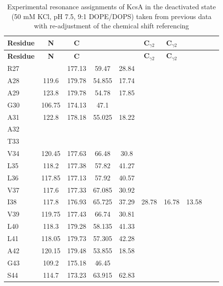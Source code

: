 \documentclass[%
 aip,
 amsmath,amssymb,
 preprint,%
]{revtex4-1}
\newcommand{\ca}{\ce{C_\alpha} }
\newcommand{\cb}{\ce{C_\beta} }
\newcommand{\cd}{\ce{C_\delta} }
\newcommand{\cep}{\ce{C_\epsilon} }
\newcommand{\cz}{\ce{C_\zeta} }
\begin{document}
\begingroup
\begin{center}
\begin{longtable}{l|c|c|c|c|c|c|c|c|c}
\caption{\scriptsize Experimental resonance assignments of KcsA in the deactivated state (50 mM KCl, pH 7.5, 9:1 DOPE/DOPS) taken from previous data\cite{Wylie2014} with re-adjustment of the chemical shift referencing\label{SI_tb_deactivated_exp_CS}}\\ \hline \hline 
\textbf{Residue} & \textbf{N} & \textbf{C} & \textbf{\ca} & \textbf{\cb} & \textbf{C$_{\gamma2}$} & \textbf{C$_{\gamma2}$} & \textbf{\cd} & \textbf{\cep} & \textbf{\cz} \\ \hline
\endfirsthead 
\hline
\textbf{Residue} & \textbf{N} & \textbf{C} & \textbf{\ca} & \textbf{\cb} & \textbf{C$_{\gamma2}$} & \textbf{C$_{\gamma2}$} & \textbf{\cd} & \textbf{\cep} & \textbf{\cz} \\ \hline
\endhead
R27 & & 177.13 & 59.47 & 28.84 & & & & & \\\hline
A28 & 119.6 & 179.78 & 54.855 & 17.74 & & & & & \\\hline
A29 & 123.8 & 179.78 & 54.78 & 17.85 & & & & & \\\hline
G30 & 106.75 & 174.13 & 47.1 & & & & & & \\\hline
A31 & 122.8 & 178.18 & 55.025 & 18.22 & & & & & \\\hline
A32 & & & & & & & & & \\\hline
T33 & & & & & & & & & \\\hline
V34 & 120.45 & 177.63 & 66.48 & 30.8 & & & & & \\\hline
L35 & 118.2 & 177.38 & 57.82 & 41.27 & & & & & \\\hline
L36 & 117.85 & 177.13 & 57.92 & 40.57 & & & & & \\\hline
V37 & 117.6 & 177.33 & 67.085 & 30.92 & & & & & \\\hline
I38 & 117.8 & 176.93 & 65.725 & 37.29 & 28.78 & 16.78 & 13.58 & & \\\hline
V39 & 119.75 & 177.43 & 66.74 & 30.81 & & & & & \\\hline
L40 & 118.3 & 179.28 & 58.135 & 41.33 & & & & & \\\hline
L41 & 118.05 & 179.73 & 57.305 & 42.28 & & & & & \\\hline
A42 & 120.15 & 179.48 & 53.855 & 18.58 & & & & & \\\hline
G43 & 109.2 & 175.18 & 46.45 & & & & & & \\\hline
S44 & 114.7 & 173.23 & 63.915 & 62.83 & & & & & \\\hline

\end{longtable}
\end{center}
\end{document}
